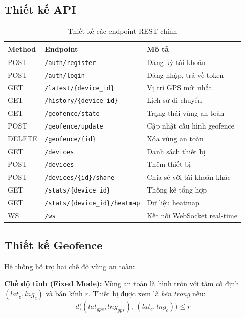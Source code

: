 \subsection{Thiết kế API}

\begin{table}[H]
\centering
\caption{Thiết kế các endpoint REST chính}
\label{tab:api_design}
\begin{tabularx}{\textwidth}{l l X}
\toprule
\textbf{Method} & \textbf{Endpoint} & \textbf{Mô tả} \\
\midrule
POST & \texttt{/auth/register} & Đăng ký tài khoản \\
POST & \texttt{/auth/login}    & Đăng nhập, trả về token \\
\midrule
GET  & \texttt{/latest/\{device\_id\}}      & Vị trí GPS mới nhất \\
GET  & \texttt{/history/\{device\_id\}}     & Lịch sử di chuyển \\
\midrule
GET  & \texttt{/geofence/state}          & Trạng thái vùng an toàn \\
POST & \texttt{/geofence/update}         & Cập nhật cấu hình geofence \\
DELETE & \texttt{/geofence/\{id\}}       & Xóa vùng an toàn \\
\midrule
GET  & \texttt{/devices}                 & Danh sách thiết bị \\
POST & \texttt{/devices}                 & Thêm thiết bị \\
POST & \texttt{/devices/\{id\}/share}    & Chia sẻ với tài khoản khác \\
\midrule
GET  & \texttt{/stats/\{device\_id\}}           & Thống kê tổng hợp \\
GET  & \texttt{/stats/\{device\_id\}/heatmap}   & Dữ liệu heatmap \\
\midrule
WS   & \texttt{/ws}                      & Kết nối WebSocket real-time \\
\bottomrule
\end{tabularx}
\end{table}

\subsection{Thiết kế Geofence}

Hệ thống hỗ trợ hai chế độ vùng an toàn:

\textbf{Chế độ tĩnh (Fixed Mode):} Vùng an toàn là hình tròn với tâm cố định $(lat_c, lng_c)$ và bán kính $r$. Thiết bị được xem là \textit{bên trong} nếu:
\begin{equation}
  d\big((lat_{gps}, lng_{gps}),\, (lat_c, lng_c)\big) \leq r
  \label{eq:geofence_fixed}
\end{equation}

